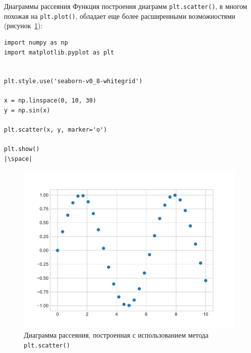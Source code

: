 \documentclass[aspectratio=169, mathserif]{beamer}	%
\begin{document}
\begin{frame}[fragile, label=m]{Диаграммы рассеяния}
\scriptsize
Функция построения диаграмм \texttt{plt.scatter()}, в многом похожая на  \texttt{plt.plot()}, обладает еще более расширенными возможностями (рисунок~\ref{fig:fig_17}):
\vfill
\begin{minipage}{.4\textwidth}
\begin{verbatim}
import numpy as np
import matplotlib.pyplot as plt


plt.style.use('seaborn-v0_8-whitegrid')

x = np.linspace(0, 10, 30)
y = np.sin(x)

plt.scatter(x, y, marker='o')

plt.show()
|\space|
\end{verbatim}
\end{minipage}
\begin{minipage}{.59\textwidth}
\begin{figure}[h!]
	\centering
	\includegraphics[width=.85\linewidth]{./pics/Figure_17}
	\caption{Диаграмма рассеяния, построенная с использованием метода \texttt{plt.scatter()}}
	\label{fig:fig_17}
\end{figure}
\end{minipage}
\vfill
\end{frame}
\end{document}

